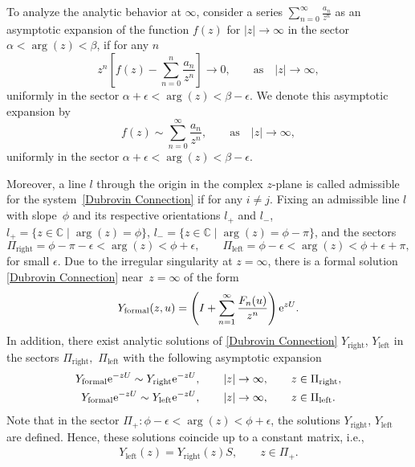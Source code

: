 To analyze the analytic behavior at $\infty$, consider a series
$\sum_{n=0}^{\infty} \frac{a_n}{z^n}$
as an asymptotic expansion of the function $f(z)$ for
$
\lvert z \rvert \to \infty$ in the sector $\alpha < \arg(z) < \beta$,
if for any $n$
\[
z^n\left[f(z)- \sum_{n=0}^{n} \frac{a_n}{z^n} \right] \to 0, \qquad \text{as} \quad \lvert z \rvert \to \infty,
\]
uniformly in the sector $ \alpha+\epsilon < \arg(z) < \beta-\epsilon$.
We denote this asymptotic expansion by{\samepage
\[
f(z)\sim\sum_{n=0}^{\infty} \frac{a_n}{z^n} , \qquad \text{as} \quad \lvert z \rvert \to \infty,
\]
uniformly in the sector $\alpha+\epsilon < \arg(z) < \beta-\epsilon$.}


Moreover, a line \(l\) through the origin in the complex \(z\)-plane is called admissible for the system~\eqref{Dubrovin Connection} if
 for any $ i \neq j$.
Fixing an admissible line \(l\) with slope~\(\phi\) and its respective orientations \(l_{+}\) and \(l_{-}\),
$
 l_{+} = \{ z \in \mathbb{C}\mid \arg(z) = \phi\}$, $
 l_{-} = \{ z \in \mathbb{C}\mid \arg(z) = \phi-\pi\}$,
and the sectors
\[
 \Pi_{\text{right}} = \phi-\pi-\epsilon < \arg(z) < \phi+\epsilon,\qquad
 \Pi_{\text{left}} = \phi-\epsilon < \arg(z) < \phi+\epsilon+\pi,
\]
for small \(\epsilon\). Due to the irregular singularity at \(z=\infty\), there is a formal solution \eqref{Dubrovin Connection} near~${z=\infty}$ of the form
\begin{gather}\label{formal solution of Dubrovin connection at infinity}
Y_{\text{formal}}(z,u) = \left(I+\sum_{n=1}^{\infty}\frac{F_n(u)}{z^n} \right){\rm e}^{zU}.
\end{gather}
In addition, there exist analytic solutions of \eqref{Dubrovin Connection} \(Y_{\text{right}}\), \(Y_{\text{left}}\) in the sectors \(\Pi_{\text{right}},\) \(\Pi_{\text{left}}\) with the following asymptotic expansion
\begin{gather*}
 Y_{\text{formal}}{\rm e}^{-zU} \sim Y_{\text{right}}{\rm e}^{-zU} , \qquad \lvert z \rvert \to \infty, \qquad z \in \Pi_{\text{right}},\\
 Y_{\text{formal}}{\rm e}^{-zU} \sim Y_{\text{left}}{\rm e}^{-zU} , \qquad \lvert z \rvert \to \infty, \qquad z \in \Pi_{\text{left}}.
\end{gather*}
Note that in the sector
$
\Pi_{+} \colon \phi-\epsilon < \arg(z) < \phi+\epsilon$,
the solutions \(Y_{\text{right}}\), \(Y_{\text{left}}\) are defined. Hence, these solutions coincide up to a constant matrix, i.e.,
\begin{gather}\label{Stokes matrix definition}
 Y_{\text{left}}(z) = Y_{\text{right}}(z)S, \qquad z \in \Pi_{+}.
\end{gather}
